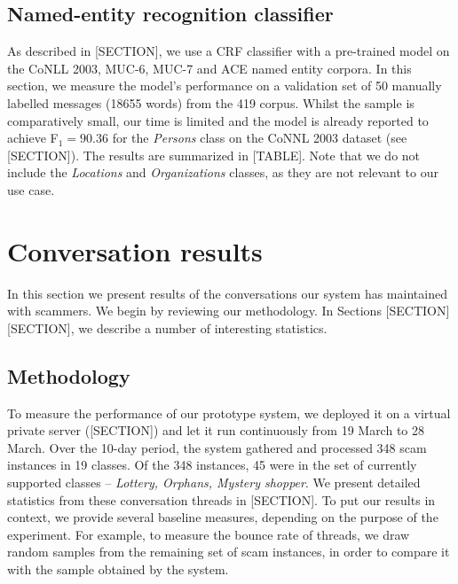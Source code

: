 \subsection{Named-entity recognition classifier}
As described in [SECTION], we use a CRF classifier with a pre-trained model on the CoNLL 2003, MUC-6, MUC-7 and ACE named entity corpora. In this section, we measure the model's performance on a validation set of 50 manually labelled messages (18655 words) from the 419 corpus. Whilst the sample is comparatively small, our time is limited and the model is already reported to achieve F$_{1} = 90.36$ for the \emph{Persons} class on the CoNNL 2003 dataset (see [SECTION]). The results are summarized in [TABLE]. Note that we do not include the \emph{Locations} and \emph{Organizations} classes, as they are not relevant to our use case.
\begin{center}
\end{center}

\section{Conversation results}
In this section we present results of the conversations our system has maintained with scammers. We begin by reviewing our methodology. In Sections [SECTION][SECTION], we describe a number of interesting statistics.
\subsection{Methodology}
To measure the performance of our prototype system, we deployed it on a virtual private server ([SECTION]) and let it run continuously from 19 March to 28 March. Over the 10-day period, the system gathered and processed 348 scam instances in 19 classes. Of the 348 instances, 45 were in the set of currently supported classes -- \textit{Lottery, Orphans, Mystery shopper}. We present detailed statistics from these conversation threads in [SECTION]. To put our results in context, we provide several baseline measures, depending on the purpose of the experiment. For example, to measure the bounce rate of threads, we draw random samples from the remaining set of scam instances, in order to compare it with the sample obtained by the system.

